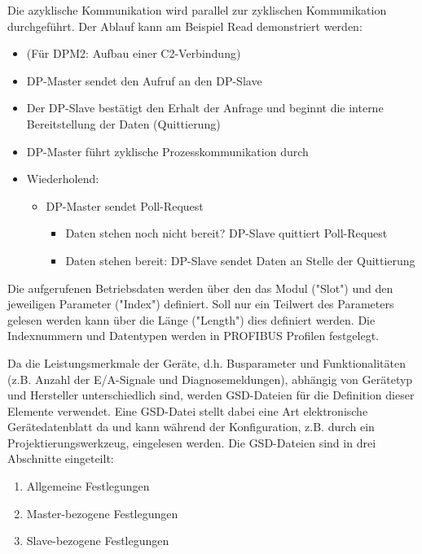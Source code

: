 
Die azyklische Kommunikation wird parallel zur zyklischen Kommunikation durchgeführt. Der Ablauf kann am Beispiel Read demonstriert werden:
\begin{itemize}
\item (Für DPM2: Aufbau einer C2-Verbindung)
\item DP-Master sendet den Aufruf an den DP-Slave
\item Der DP-Slave bestätigt den Erhalt der Anfrage und beginnt die interne Bereitstellung der Daten (Quittierung)
\item DP-Master führt zyklische Prozesskommunikation durch
\item Wiederholend:
\begin{itemize}
\item DP-Master sendet Poll-Request
\begin{itemize}
\item Daten stehen noch nicht bereit? DP-Slave quittiert Poll-Request
\item Daten stehen bereit: DP-Slave sendet Daten an Stelle der Quittierung
\end{itemize}
\end{itemize}
\end{itemize}

Die aufgerufenen Betriebsdaten werden über den das Modul ("Slot") und den jeweiligen Parameter ("Index") definiert. Soll nur ein Teilwert des Parameters gelesen werden kann über die Länge ("Length") dies definiert werden. Die Indexnummern und Datentypen werden in PROFIBUS Profilen festgelegt.


Da die Leistungsmerkmale der Geräte, d.h. Busparameter und Funktionalitäten (z.B. Anzahl der E/A-Signale und Diagnosemeldungen), abhängig von Gerätetyp und Hersteller unterschiedlich sind, werden GSD-Dateien für die Definition dieser Elemente verwendet. Eine GSD-Datei stellt dabei eine Art elektronische Gerätedatenblatt da und kann während der Konfiguration, z.B. durch ein Projektierungswerkzeug, eingelesen werden. Die GSD-Dateien sind in drei Abschnitte eingeteilt:
\begin{enumerate}
\item Allgemeine Festlegungen
\item Master-bezogene Festlegungen
\item Slave-bezogene Festlegungen
\end{enumerate}


